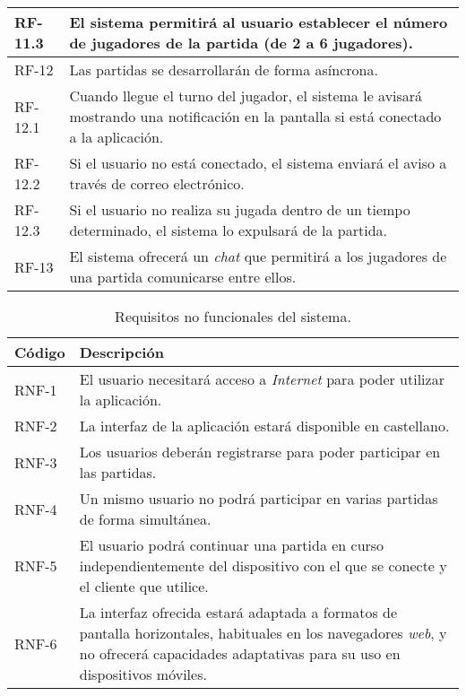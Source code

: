 \documentclass[11pt, a4paper, titlepage]{article}
\begin{document}
\begin{longtable}[h!]{| p{} | p{} |}
         \hline
         RF-11.3 & El sistema permitirá al usuario establecer el número de jugadores de la partida (de 2 a 6 jugadores).\\
         \hline
         RF-12 & Las partidas se desarrollarán de forma asíncrona.\\
         \hline
         RF-12.1 & Cuando llegue el turno del jugador, el sistema le avisará mostrando una notificación en la pantalla si está conectado a la aplicación.\\
         \hline
         RF-12.2 & Si el usuario no está conectado, el sistema enviará el aviso a través de correo electrónico.\\
         \hline
         RF-12.3 & Si el usuario no realiza su jugada dentro de un tiempo determinado, el sistema lo expulsará de la partida.\\
         \hline
         RF-13 & El sistema ofrecerá un \textit{chat} que permitirá a los jugadores de una partida comunicarse entre ellos.\\
         \hline
\end{longtable}

\newpage
\begin{table}[h!]
    \centering
    \begin{tabularx}{\textwidth}{|l|X|}
         \hline
         Código & Descripción \\
         \hline
         RNF-1 & El usuario necesitará acceso a \textit{Internet} para poder utilizar la aplicación.\\
         \hline
         RNF-2 & La interfaz de la aplicación estará disponible en castellano.\\
         \hline
         RNF-3 & Los usuarios deberán registrarse para poder participar en las partidas.\\
         \hline
         RNF-4 & Un mismo usuario no podrá participar en varias partidas de forma simultánea. \\
         \hline
         RNF-5 & El usuario podrá continuar una partida en curso independientemente del dispositivo con el que se conecte y el cliente que utilice.\\
         \hline
         RNF-6 & La interfaz ofrecida estará adaptada a formatos de pantalla horizontales, habituales en los navegadores \textit{web}, y no ofrecerá capacidades adaptativas para su uso en dispositivos móviles.\\
         \hline
    \end{tabularx}
    \caption{Requisitos no funcionales del sistema.}
    \label{tab:rnf}
\end{table}
\end{document}

